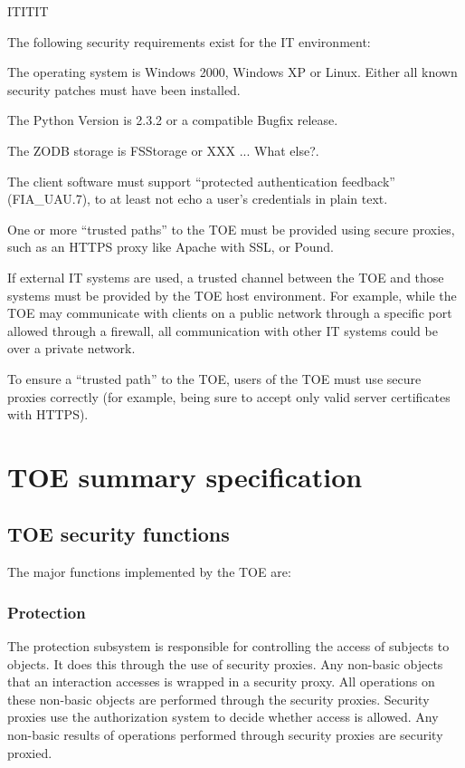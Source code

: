 \documentclass[12pt,english]{scrbook}
\begin{document}
ITITIT

The following security requirements exist for the IT environment:

The operating system is Windows 2000, Windows XP or Linux. Either all
known security patches must have been installed.

The Python Version is 2.3.2 or a compatible Bugfix release.

The ZODB storage is FSStorage or XXX ... What else?.

The client software must support ``protected authentication feedback''
(FIA{\_}UAU.7), to at least not echo a user's credentials in plain text.

One or more ``trusted paths'' to the TOE must be provided using secure
proxies, such as an HTTPS proxy like Apache with SSL, or Pound.

If external IT systems are used, a trusted channel between the TOE and
those systems must be provided by the TOE host environment.  For
example, while the TOE may communicate with clients on a public
network through a specific port allowed through a firewall, all
communication with other IT systems could be over a private network.

To ensure a ``trusted path'' to the TOE, users of the TOE must use
secure proxies correctly (for example, being sure to accept only
valid server certificates with HTTPS).


\chapter{TOE summary specification}


\section{TOE security functions}

The major functions implemented by the TOE are:





\subsection{Protection}

The protection subsystem is responsible for controlling the access of subjects
to objects.  It does this through the use of security proxies.  Any non-basic
objects that an interaction accesses is wrapped in a security proxy.  All
operations on these non-basic objects are performed through the security
proxies. Security proxies use the authorization system to decide whether access
is allowed.  Any non-basic results of operations performed through security
proxies are security proxied.
\end{document}

